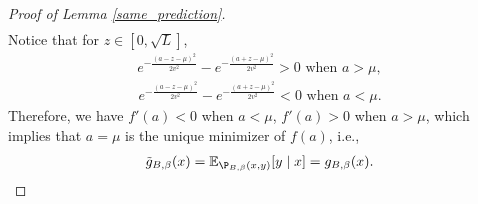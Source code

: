 \begin{proof}[Proof of Lemma \ref{same_prediction}]
\begin{align}
\end{align}
Notice that for $z\in [0,\sqrt{L}]$,
\begin{align}
e^{-\frac{(a-z-\mu)^{2}}{2v^{2}}}-e^{-\frac{(a+z-\mu)^{2}}{2v^{2}}}>0 \text{ when } a>\mu,
\end{align}
\begin{align}
e^{-\frac{(a-z-\mu)^{2}}{2v^{2}}}-e^{-\frac{(a+z-\mu)^{2}}{2v^{2}}}<0 \text{ when } a<\mu.
\end{align}
Therefore, we have $f'(a)<0$ when $a<\mu$, $f'(a)>0$ when $a>\mu$, which implies that $a=\mu$ is the unique minimizer of $f(a)$, i.e.,
\begin{align}
\tilde{g}_{B,\beta}(x)=\mathbb{E}_{\P_{B, \beta}(x, y)}[y \mid x]={g}_{B,\beta}(x).
\end{align}
\end{proof}


